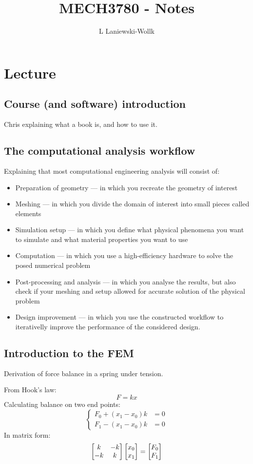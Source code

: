\documentclass[12pt]{article}
\title{MECH3780 - Notes}
\author{L Laniewski-Wollk}
\begin{document}
\maketitle
\section{Lecture}
\subsection{Course (and software) introduction}
Chris explaining what a book is, and how to use it.
\subsection{The computational analysis workflow}
Explaining that most computational engineering analysis will consist of:
\begin{itemize}
\item Preparation of geometry --- in which you recreate the geometry of interest
\item Meshing --- in which you divide the domain of interest into small pieces called elements
\item Simulation setup --- in which you define what physical phenomena you want to simulate and what material properties you want to use
\item Computation --- in which you use a high-efficiency hardware to solve the posed numerical problem
\item Post-processing and analysis --- in which you analyse the results, but also check if your meshing and setup allowed for accurate solution of the physical problem
\item Design improvement --- in which you use the constructed workflow to iterativelly improve the performance of the considered design.
\end{itemize}
\subsection{Introduction to the FEM}
Derivation of force balance in a spring under tension.

From Hook's law:
\[F = kx\]
Calculating balance on two end points:
\[\begin{cases}
    F_0 + (x_1 - x_0)k &= 0\\
    F_1 - (x_1 - x_0)k &= 0
\end{cases}\]
In matrix form:
\[\left[\begin{matrix}k & -k\\-k & k\end{matrix}\right]\left[\begin{matrix}x_0\\x_1\end{matrix}\right]=\left[\begin{matrix}F_0\\F_1\end{matrix}\right]\]
\end{document}
